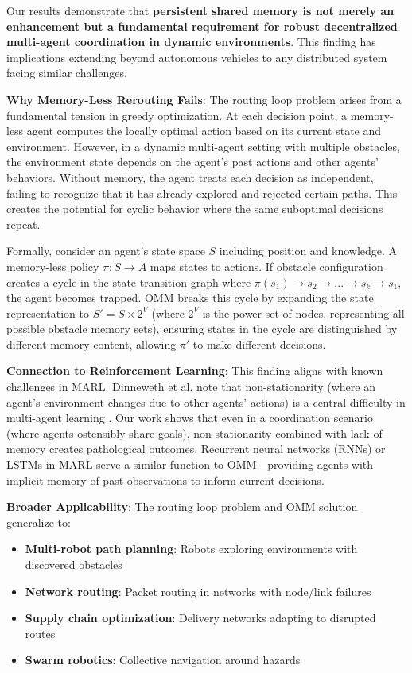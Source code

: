\documentclass[conference]{IEEEtran}
\begin{document}
Our results demonstrate that \textbf{persistent shared memory is not merely an enhancement but a fundamental requirement for robust decentralized multi-agent coordination in dynamic environments}. This finding has implications extending beyond autonomous vehicles to any distributed system facing similar challenges.

\textbf{Why Memory-Less Rerouting Fails}: The routing loop problem arises from a fundamental tension in greedy optimization. At each decision point, a memory-less agent computes the locally optimal action based on its current state and environment. However, in a dynamic multi-agent setting with multiple obstacles, the environment state depends on the agent's past actions and other agents' behaviors. Without memory, the agent treats each decision as independent, failing to recognize that it has already explored and rejected certain paths. This creates the potential for cyclic behavior where the same suboptimal decisions repeat.

Formally, consider an agent's state space $S$ including position and knowledge. A memory-less policy $\pi: S \rightarrow A$ maps states to actions. If obstacle configuration creates a cycle in the state transition graph where $\pi(s_1) \rightarrow s_2 \rightarrow ... \rightarrow s_k \rightarrow s_1$, the agent becomes trapped. OMM breaks this cycle by expanding the state representation to $S' = S \times 2^V$ (where $2^V$ is the power set of nodes, representing all possible obstacle memory sets), ensuring states in the cycle are distinguished by different memory content, allowing $\pi'$ to make different decisions.

\textbf{Connection to Reinforcement Learning}: This finding aligns with known challenges in MARL. Dinneweth et al. note that non-stationarity (where an agent's environment changes due to other agents' actions) is a central difficulty in multi-agent learning \cite{dinneweth2022multi}. Our work shows that even in a coordination scenario (where agents ostensibly share goals), non-stationarity combined with lack of memory creates pathological outcomes. Recurrent neural networks (RNNs) or LSTMs in MARL serve a similar function to OMM—providing agents with implicit memory of past observations to inform current decisions.

\textbf{Broader Applicability}: The routing loop problem and OMM solution generalize to:
\begin{itemize}
    \item \textbf{Multi-robot path planning}: Robots exploring environments with discovered obstacles
    \item \textbf{Network routing}: Packet routing in networks with node/link failures
    \item \textbf{Supply chain optimization}: Delivery networks adapting to disrupted routes
    \item \textbf{Swarm robotics}: Collective navigation around hazards
\end{itemize}
\end{document}
